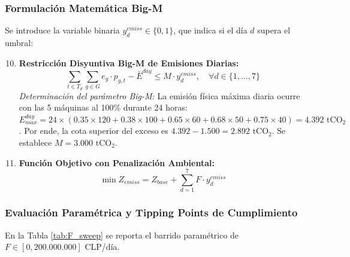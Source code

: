 \documentclass[10pt,letterpaper]{article}
\begin{document}
\subsubsection*{Formulación Matemática Big-M}
Se introduce la variable binaria $y_d^{emiss} \in \{0, 1\}$, que indica si el día $d$ supera el umbral:
\begin{enumerate}[label=\textbf{R\arabic*.}]
    \setcounter{enumi}{9}
    \item \textbf{Restricción Disyuntiva Big-M de Emisiones Diarias:}
    \begin{equation}
        \sum_{t \in T_d} \sum_{g \in G} e_g \cdot p_{g,t} - \bar{E}^{day} \le M \cdot y_d^{emiss}, \quad \forall d \in \{1, \ldots, 7\} \label{eq:big_m}
    \end{equation}
    \textit{Determinación del parámetro Big-M:} La emisión física máxima diaria ocurre con las 5 máquinas al 100\% durante 24 horas: $E_{max}^{day} = 24 \times (0.35 \times 120 + 0.38 \times 100 + 0.65 \times 60 + 0.68 \times 50 + 0.75 \times 40) = 4.392 \text{ tCO}_2$. Por ende, la cota superior del exceso es $4.392 - 1.500 = 2.892 \text{ tCO}_2$. Se establece $M = 3.000 \text{ tCO}_2$.
    \item \textbf{Función Objetivo con Penalización Ambiental:}
    \begin{equation}
        \min Z_{emiss} = Z_{base} + \sum_{d=1}^7 F \cdot y_d^{emiss} \label{eq:fo_emiss}
    \end{equation}
\end{enumerate}

\subsubsection*{Evaluación Paramétrica y Tipping Points de Cumplimiento}
En la Tabla \ref{tab:F_sweep} se reporta el barrido paramétrico de $F \in [0, 200.000.000]$ CLP/día.
\end{document}
